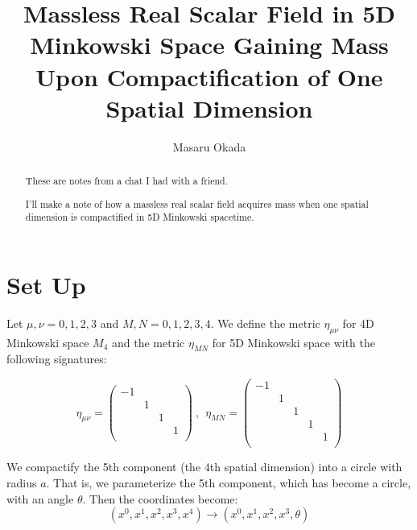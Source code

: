 \documentclass{article}
\title{
Massless Real Scalar Field in 5D Minkowski Space \newline Gaining Mass Upon Compactification of One Spatial Dimension
}
\author{
Masaru Okada
}
\begin{document}
\maketitle

\begin{abstract}
	These are notes from a chat I had with a friend.

	I'll make a note of how a massless real scalar field acquires mass when one spatial dimension is compactified in 5D Minkowski spacetime.
\end{abstract}

\section{Set Up}

Let $\mu,\nu = 0,1,2,3$ and $M,N=0,1,2,3,4$.
We define the metric $\eta_{\mu \nu}$ for 4D Minkowski space $M_{4}$ and the metric $\eta_{MN}$ for 5D Minkowski space with the following signatures:

$$
	\eta_{\mu \nu}
	=
	\begin{pmatrix}
		-1 &   &   &   \\
		   & 1 &   &   \\
		   &   & 1 &   \\
		   &   &   & 1 \\
	\end{pmatrix}
	\ , \ \
	\eta_{MN}
	=
	\begin{pmatrix}
		-1 &   &   &   &   \\
		   & 1 &   &   &   \\
		   &   & 1 &   &   \\
		   &   &   & 1 &   \\
		   &   &   &   & 1 \\
	\end{pmatrix}
$$

We compactify the 5th component (the 4th spatial dimension) into a circle with radius $a$.
That is, we parameterize the 5th component, which has become a circle, with an angle $\theta$.
Then the coordinates become:
$$
	(x^0, x^1, x^2, x^3, x^4)
	\to
	(x^0, x^1, x^2, x^3, \theta)
$$
\end{document}
